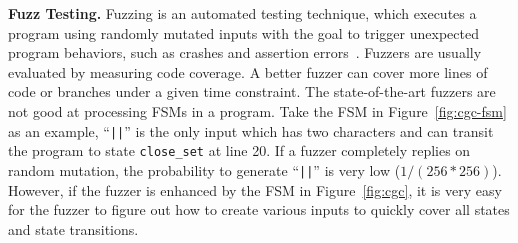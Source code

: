 \noindent\textbf{Fuzz Testing.}
Fuzzing is an automated testing technique, 
which executes a program
using randomly mutated inputs 
with the goal to trigger unexpected program behaviors,
such as crashes and assertion errors~\cite{afl,Angora,youwei-1}. 
Fuzzers are usually evaluated by measuring code coverage. 
A better fuzzer can cover more lines of code 
or branches under a given time constraint.
The state-of-the-art fuzzers are not good at processing 
FSMs in a program.
Take the FSM in Figure~\ref{fig:cgc-fsm} as an example, 
``\verb/||/'' is the only input which has two characters and 
can transit the program to state \texttt{close\_set} at line 20.
If a fuzzer completely replies on random mutation, the probability to 
generate ``\verb/||/'' is very low ($1/(256 * 256)$). 
However, if the fuzzer is enhanced by the 
FSM in Figure~\ref{fig:cgc}, 
it is very easy for the fuzzer to figure out how to create various inputs to quickly cover 
all states and state transitions.  






